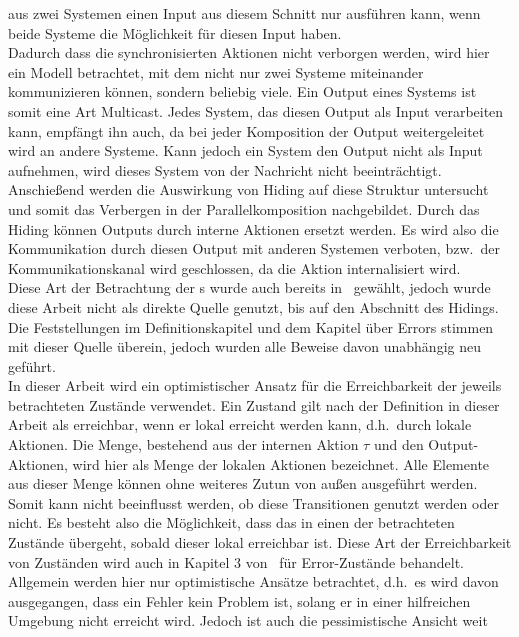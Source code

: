 aus zwei Systemen einen Input aus diesem Schnitt nur ausführen kann, wenn beide
Systeme die Möglichkeit für diesen Input haben.\\
Dadurch dass die synchronisierten Aktionen nicht verborgen werden, wird hier
ein Modell betrachtet, mit dem nicht nur zwei Systeme miteinander kommunizieren können,
sondern beliebig viele. Ein Output eines Systems ist somit eine Art Multicast.
Jedes System, das diesen Output als Input verarbeiten kann, empfängt ihn auch,
da bei jeder Komposition der Output weitergeleitet wird an andere Systeme.
Kann jedoch ein System den Output nicht als Input aufnehmen, wird dieses System von
der Nachricht nicht beeinträchtigt.\\
Anschießend werden die Auswirkung von Hiding auf diese Struktur
untersucht und somit das Verbergen in der Parallelkomposition nachgebildet.
Durch das Hiding können Outputs durch interne Aktionen ersetzt werden. Es wird
also die Kommunikation durch diesen Output mit anderen Systemen verboten, bzw.\
der Kommunikationskanal wird geschlossen, da die Aktion internalisiert wird.\\
Diese Art der Betrachtung der
\EIO{}s wurde auch bereits in~\cite{Schlosser2012BA} gewählt, jedoch wurde
diese Arbeit nicht als direkte Quelle genutzt, bis auf den Abschnitt des
Hidings. Die Feststellungen im Definitionskapitel und dem Kapitel über
Errors stimmen mit dieser Quelle überein, jedoch wurden alle Beweise davon unabhängig neu
geführt.\\
In dieser Arbeit wird ein optimistischer Ansatz für die Erreichbarkeit
der jeweils betrachteten Zustände verwendet. Ein Zustand gilt nach der Definition in dieser
Arbeit als erreichbar, wenn er lokal erreicht
werden kann, d.h.\ durch lokale Aktionen. Die Menge, bestehend aus der internen
Aktion $\tau$ und den Output-Aktionen, wird hier als Menge der lokalen Aktionen
bezeichnet.
Alle Elemente aus dieser Menge können ohne weiteres Zutun von außen ausgeführt
werden. Somit kann nicht beeinflusst werden, ob diese Transitionen genutzt
werden oder nicht. Es besteht also die Möglichkeit, dass das \EIO{} in einen
der betrachteten Zustände übergeht, sobald dieser lokal erreichbar ist. Diese Art der
Erreichbarkeit von Zuständen wird auch in Kapitel 3 von~\cite{Vogler2014EIO}
für Error-Zustände behandelt.\\
Allgemein werden hier nur optimistische Ansätze betrachtet, d.h.\ es wird davon
ausgegangen, dass ein Fehler kein Problem ist, solang er in einer hilfreichen
Umgebung nicht erreicht wird. Jedoch ist auch die pessimistische Ansicht weit
